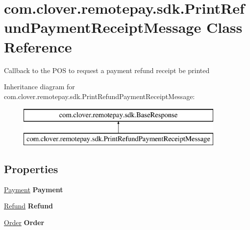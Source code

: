 \hypertarget{classcom_1_1clover_1_1remotepay_1_1sdk_1_1_print_refund_payment_receipt_message}{}\section{com.\+clover.\+remotepay.\+sdk.\+Print\+Refund\+Payment\+Receipt\+Message Class Reference}
\label{classcom_1_1clover_1_1remotepay_1_1sdk_1_1_print_refund_payment_receipt_message}


Callback to the P\+OS to request a payment refund receipt be printed  


Inheritance diagram for com.\+clover.\+remotepay.\+sdk.\+Print\+Refund\+Payment\+Receipt\+Message\+:\begin{figure}[H]
\begin{center}
\leavevmode
\includegraphics[height=2.000000cm]{classcom_1_1clover_1_1remotepay_1_1sdk_1_1_print_refund_payment_receipt_message}
\end{center}
\end{figure}
\subsection*{Properties}
\begin{DoxyCompactItemize}
\item 
\mbox{\label{classcom_1_1clover_1_1remotepay_1_1sdk_1_1_print_refund_payment_receipt_message_a8247998f4e3f9748ece563f49c0f78ec}} 
\hyperlink{classcom_1_1clover_1_1sdk_1_1v3_1_1payments_1_1_payment}{Payment} {\bfseries Payment}
\item 
\mbox{\label{classcom_1_1clover_1_1remotepay_1_1sdk_1_1_print_refund_payment_receipt_message_af5134cd99b8a029446d3311c877b1ad7}} 
\hyperlink{classcom_1_1clover_1_1sdk_1_1v3_1_1payments_1_1_refund}{Refund} {\bfseries Refund}
\item 
\mbox{\label{classcom_1_1clover_1_1remotepay_1_1sdk_1_1_print_refund_payment_receipt_message_ac7ce4bee64504c338f06e399eeb900e2}} 
\hyperlink{classcom_1_1clover_1_1sdk_1_1v3_1_1order_1_1_order}{Order} {\bfseries Order}
\end{DoxyCompactItemize}


